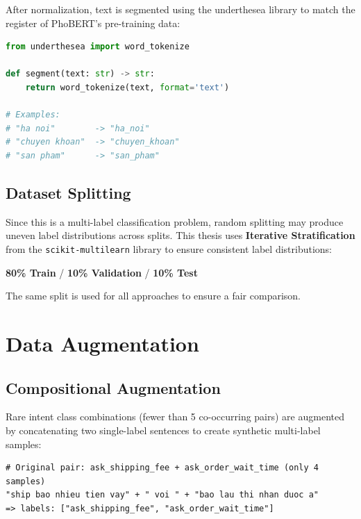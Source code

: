 \documentclass[12pt, a4paper]{report}
\begin{document}
After normalization, text is segmented using the underthesea library
to match the register of PhoBERT's pre-training data:

\begin{lstlisting}[language=Python, caption={Word segmentation with underthesea}]
from underthesea import word_tokenize

def segment(text: str) -> str:
    return word_tokenize(text, format='text')

# Examples:
# "ha noi"        -> "ha_noi"
# "chuyen khoan"  -> "chuyen_khoan"
# "san pham"      -> "san_pham"
\end{lstlisting}

\subsection{Dataset Splitting}

Since this is a multi-label classification problem, random splitting
may produce uneven label distributions across splits.
This thesis uses \textbf{Iterative Stratification} \cite{sechidis2011stratification}
from the \texttt{scikit-multilearn} library to ensure consistent label distributions:

\begin{center}
\textbf{80\% Train} / \textbf{10\% Validation} / \textbf{10\% Test}
\end{center}

The same split is used for all approaches to ensure a fair comparison.

\section{Data Augmentation}
\label{subsec:augmentation}

\subsection{Compositional Augmentation}

Rare intent class combinations (fewer than 5 co-occurring pairs) are augmented
by concatenating two single-label sentences to create synthetic multi-label samples:

\begin{lstlisting}[caption={Compositional augmentation example}]
# Original pair: ask_shipping_fee + ask_order_wait_time (only 4 samples)
"ship bao nhieu tien vay" + " voi " + "bao lau thi nhan duoc a"
=> labels: ["ask_shipping_fee", "ask_order_wait_time"]
\end{lstlisting}
\end{document}
